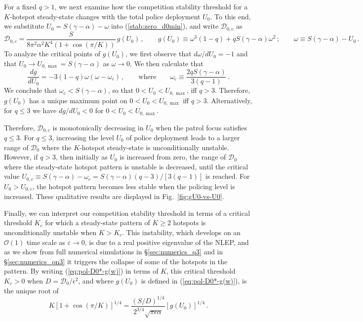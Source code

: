 \documentclass{article}%
\newcommand{\eps}{{\displaystyle \varepsilon}}
\begin{document}
For a fixed $q>1$, we next examine how the competition stability
threshold for a $K$-hotspot steady-state changes with the total police
deployment $U_{0}$.  To this end, we substitute
$U_{0}=S(\gamma-\alpha) - \omega$ into (\ref{stab:zero_d0min}),
and write ${\mathcal D}_{0,c}$ as
\begin{equation}
   {\mathcal D}_{0,c} = \frac{S}{8 \pi^2 \alpha^2 K^4 \left(1
      + \cos\left({\pi /K}\right)\right)} \, g(U_0) \,, \qquad
 g(U_0) \equiv\omega^{3}(1-q)+qS(\gamma-\alpha)\omega^{2}\,; \qquad
   \omega \equiv S(\gamma-\alpha) - U_0 \,. \label{eq:pol-D0*-g(w)}
\end{equation}
To analyze the critical points of $g(U_0)$, we first observe that 
${d\omega/dU_{0}}=-1$ and that $U_{0}\to U_{0,\max}=S(\gamma-\alpha)$ as 
$\omega \to 0$. We then calculate that
\begin{equation*}
\frac{dg}{dU_{0}}  =  -3 (1-q) \omega \left(\omega-\omega_c\right) \,,
\qquad \mbox{where}\qquad \omega_{c}\equiv 
\frac{2qS(\gamma-\alpha)}{3(q-1)}\,.
\end{equation*}
We conclude that $\omega_c<S(\gamma-\alpha)$, so that
$0<U_0<U_{0,\max}$, iff $q>3$. Therefore, $g(U_0)$ has a unique maximum
point on $0<U_0<U_{0,\max}$ iff $q>3$.  Alternatively, for $q\leq 3$
we have ${dg/dU_{0}}<0$ for $0<U_{0}<U_{0,\max}$.

Therefore, ${\mathcal D}_{0,c}$ is monotonically decreasing in $U_{0}$
when the patrol focus satisfies $q\leq 3$. For $q\leq 3$, increasing
the level $U_0$ of police deployment leads to a larger range of
${\mathcal D}_0$ where the $K$-hotspot steady-state is unconditionally
unstable.  However, if $q>3$, then initially as $U_0$ is increased
from zero, the range of ${\mathcal D}_0$ where the steady-state
hotspot pattern is unstable is decreased, until the critical value
$U_{0,c} \equiv
S(\gamma-\alpha)-\omega_{c}=S(\gamma-\alpha){(q-3)/[3(q-1)]}$ is
reached. For $U_0>U_{0,c}$, the hotspot pattern becomes less stable
when the policing level is increased. These qualitative results are
displayed in Fig.~\ref{fig:gU0-vs-U0}.

Finally, we can interpret our competition stability threshold in terms
of a critical threshold $K_{c}$ for which a steady-state pattern of
$K\geq 2$ hotspots is unconditionally unstable when $K>K_{c}$.  This
instability, which develops on an ${\mathcal O}(1)$ time scale as
$\eps\to 0$, is due to a real positive eigenvalue of the NLEP, and as
we show from full numerical simulations in \S \ref{sec:numerics_q3}
and in \S \ref{sec:numerics_qn3} it triggers the collapse of some of
the hotspots in the pattern. By writing (\ref{eq:pol-D0*-g(w)}) in
terms of $K$, this critical threshold $K_{c}>0$ when $D={{\mathcal
    D}_0/\epsilon^2}$, and where $g(U_0)$ is defined in
(\ref{eq:pol-D0*-g(w)}), is the unique root of
\begin{equation}
  K \left[ 1 + \cos\left({\pi/K}\right)\right]^{1/4} =
 \frac{\left({S/D}\right)^{1/4}}{2^{3/4} \sqrt{\pi \epsilon \alpha}} \left[
   g(U_0) \right]^{1/4} \,. \label{stab:Kc+}
\end{equation}
\end{document}
